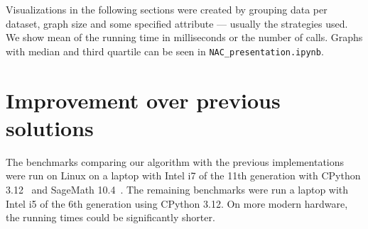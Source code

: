 Visualizations in the following sections were created by grouping data per dataset,
graph size and some specified attribute --- usually the strategies used.
%
We show mean of the running time in milliseconds or
the number of \IsNACColoring{} calls.
%
Graphs with median and third quartile can be seen in \texttt{NAC\_presentation.ipynb}.


\section{Improvement over previous solutions}

The benchmarks comparing our algorithm with the previous implementations
were run on Linux on a laptop with Intel i7 of the 11th generation
with CPython 3.12~\cite{cpython} and SageMath 10.4~\cite{sagemath}.
The remaining benchmarks were run a laptop with Intel i5 of the 6th generation
using CPython 3.12.
On more modern hardware, the running times could be significantly shorter.

